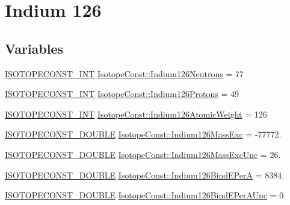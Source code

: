 \hypertarget{group___isotope_const-_indium-_in126}{}\section{Indium 126}
\label{group___isotope_const-_indium-_in126}
\subsection*{Variables}
\begin{DoxyCompactItemize}
\item 
\mbox{\hyperlink{group___isotope_const-_macros_ga5f18360b3e99483a35c32d789e62621c}{I\+S\+O\+T\+O\+P\+E\+C\+O\+N\+S\+T\+\_\+\+I\+NT}} \mbox{\hyperlink{group___isotope_const-_indium-_in126_ga8e0544a747b98f65779bb0ff62952c94}{Isotope\+Const\+::\+Indium126\+Neutrons}} = 77
\item 
\mbox{\hyperlink{group___isotope_const-_macros_ga5f18360b3e99483a35c32d789e62621c}{I\+S\+O\+T\+O\+P\+E\+C\+O\+N\+S\+T\+\_\+\+I\+NT}} \mbox{\hyperlink{group___isotope_const-_indium-_in126_ga490863043867e10a23aada278ff14ce6}{Isotope\+Const\+::\+Indium126\+Protons}} = 49
\item 
\mbox{\hyperlink{group___isotope_const-_macros_ga5f18360b3e99483a35c32d789e62621c}{I\+S\+O\+T\+O\+P\+E\+C\+O\+N\+S\+T\+\_\+\+I\+NT}} \mbox{\hyperlink{group___isotope_const-_indium-_in126_gaf9e7a4cc7b33bbce578a643853486a0f}{Isotope\+Const\+::\+Indium126\+Atomic\+Weight}} = 126
\item 
\mbox{\hyperlink{group___isotope_const-_macros_ga8f45a7272ce02c0b4c65c44636ed719a}{I\+S\+O\+T\+O\+P\+E\+C\+O\+N\+S\+T\+\_\+\+D\+O\+U\+B\+LE}} \mbox{\hyperlink{group___isotope_const-_indium-_in126_gadceffa005202445fd74aa7d9e6519890}{Isotope\+Const\+::\+Indium126\+Mass\+Exc}} = -\/77772.
\item 
\mbox{\hyperlink{group___isotope_const-_macros_ga8f45a7272ce02c0b4c65c44636ed719a}{I\+S\+O\+T\+O\+P\+E\+C\+O\+N\+S\+T\+\_\+\+D\+O\+U\+B\+LE}} \mbox{\hyperlink{group___isotope_const-_indium-_in126_ga70fbf0f6803dabcda4fa9b51f8153eb5}{Isotope\+Const\+::\+Indium126\+Mass\+Exc\+Unc}} = 26.
\item 
\mbox{\hyperlink{group___isotope_const-_macros_ga8f45a7272ce02c0b4c65c44636ed719a}{I\+S\+O\+T\+O\+P\+E\+C\+O\+N\+S\+T\+\_\+\+D\+O\+U\+B\+LE}} \mbox{\hyperlink{group___isotope_const-_indium-_in126_ga473de3d3bf91c64f8c93765bdaf05759}{Isotope\+Const\+::\+Indium126\+Bind\+E\+PerA}} = 8384.
\item 
\mbox{\hyperlink{group___isotope_const-_macros_ga8f45a7272ce02c0b4c65c44636ed719a}{I\+S\+O\+T\+O\+P\+E\+C\+O\+N\+S\+T\+\_\+\+D\+O\+U\+B\+LE}} \mbox{\hyperlink{group___isotope_const-_indium-_in126_ga3eaee09d01eb92828f69afbb29f54485}{Isotope\+Const\+::\+Indium126\+Bind\+E\+Per\+A\+Unc}} = 0.

\end{DoxyCompactItemize}
